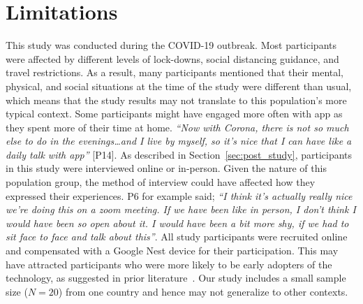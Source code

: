 \section{Limitations}

    This study was conducted during the COVID-19 outbreak. Most participants were affected by different levels of lock-downs, social distancing guidance, and travel restrictions. As a result, many participants mentioned that their mental, physical, and social situations at the time of the study were different than usual, which means that the study results may not translate to this population's more typical context. 
    Some participants might have engaged more often with \acl{app} as they spent more of their time at home. \textit{``Now with Corona, there is not so much else to do in the evenings\ldots and I live by myself, so it's nice that I can have like a daily talk with \acl{app}''} [P14].
    As described in Section~\ref{sec:post_study}, participants in this study were interviewed online or in-person. Given the nature of this population group, the method of interview could have affected how they expressed their experiences. P6 for example said; \textit{``I think it's actually really nice we're doing this on a zoom meeting. If we have been like in person, I don't think I would have been so open about it. I would have been a bit more shy, if we had to sit face to face and talk about this''}.
    All study participants were recruited online and compensated with a Google Nest device for their participation. This may have attracted participants who were more likely to be early adopters of the technology, as suggested in prior literature~\cite{lau2018alexa}.
    Our study includes a small sample size ($N=20$) from one country and hence may not generalize to other contexts.
    
    
    
    
